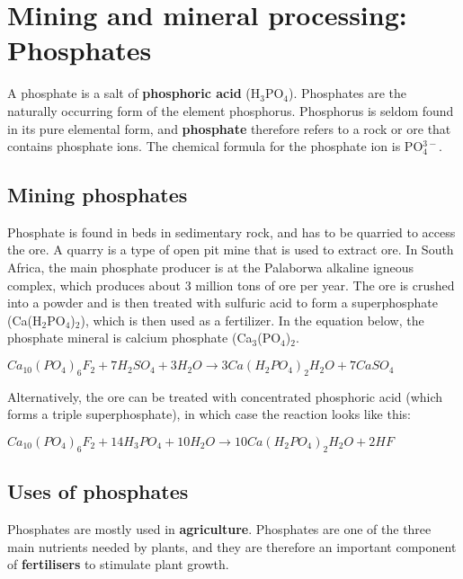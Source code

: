 



\section{Mining and mineral processing: Phosphates}

A phosphate is a salt of \textbf{phosphoric acid} (H$_{3}$PO$_{4}$). Phosphates are the naturally occurring form of the element phosphorus. Phosphorus is seldom found in its pure elemental form, and \textbf{phosphate} therefore refers to a rock or ore that contains phosphate ions. The chemical formula for the phosphate ion is PO$_{4}^{3-}$.

\subsection{Mining phosphates}

Phosphate is found in beds in sedimentary rock, and has to be quarried to access the ore. A quarry is a type of open pit mine that is used to extract ore. In South Africa, the main phosphate producer is at the Palaborwa alkaline igneous complex, which produces about 3 million tons of ore per year. The ore is crushed into a powder and is then treated with sulfuric acid to form a superphosphate (Ca(H$_{2}$PO$_{4}$)$_{2}$), which is then used as a fertilizer. In the equation below, the phosphate mineral is calcium phosphate (Ca$_{3}$(PO$_{4}$)$_{2}$.

\begin{center}
\rm${Ca_{10}(PO_{4})_{6}F_{2} + 7H_{2}SO_{4} + 3H_{2}O \rightarrow 3Ca(H_{2}PO_{4})_{2}H_{2}O + 7CaSO_{4}}$
\end{center}

Alternatively, the ore can be treated with concentrated phosphoric acid (which forms a triple superphosphate), in which case the reaction looks like this:

\begin{center}
\rm${Ca_{10}(PO_{4})_{6}F_{2} + 14H_{3}PO_{4} + 10H_{2}O \rightarrow 10Ca(H_{2}PO_{4})_{2}H_{2}O + 2HF}$
\end{center}

\subsection{Uses of phosphates}

Phosphates are mostly used in \textbf{agriculture}. Phosphates are one of the three main nutrients needed by plants, and they are therefore an important component of \textbf{fertilisers} to stimulate plant growth.

